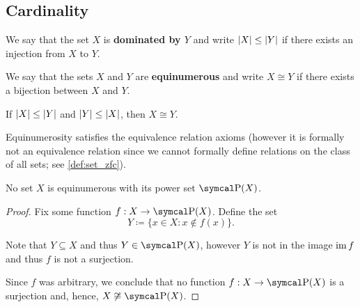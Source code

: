 \subsection{Cardinality}\label{subsec:cardinality}

\begin{definition}\label{def:set_domination}\cite[145]{Enderton1977}
  We say that the set \( X \) is \textbf{dominated by \( Y \)} and write \( \left\vert X \right\vert \leq \left\vert Y \right\vert \) if there exists an injection from \( X \) to \( Y \).
\end{definition}

\begin{definition}\label{def:equinumerous_sets}\cite[129]{Enderton1977}
  We say that the sets \( X \) and \( Y \) are \textbf{equinumerous} and write \( X \cong Y \) if there exists a bijection between \( X \) and \( Y \).
\end{definition}

\begin{theorem}\label{thm:cantor_schroder_bernstein}\cite[147]{Enderton1977}
  If \( \left\vert X \right\vert \leq \left\vert Y \right\vert \) and \( \left\vert Y \right\vert \leq \left\vert X \right\vert \), then \( X \cong Y \).
\end{theorem}

\begin{proposition}\label{thm:equinumerousity_equivalence}\cite[theorem 6A]{Enderton1977}
  Equinumerosity satisfies the equivalence relation axioms (however it is formally not an equivalence relation since we cannot formally define relations on the class of all sets; see \cref{def:set_zfc}).
\end{proposition}

\begin{theorem}[Cantor]\label{thm:cantor_power_set_theorem}\cite[theorem 6B]{Enderton1977}
  No set \( X \) is equinumerous with its power set \( \Power(X) \).
\end{theorem}
\begin{proof}
  Fix some function \( f: X \to \Power(X) \). Define the set
  \begin{equation*}
    Y \coloneqq \{ x \in X \colon x \not\in f(x) \}.
  \end{equation*}

  Note that \( Y \subseteq X \) and thus \( Y \in \Power(X) \), however \( Y \) is not in the image \( \operatorname{im} f \) and thus \( f \) is not a surjection.

  Since \( f \) was arbitrary, we conclude that no function \( f: X \to \Power(X) \) is a surjection and, hence, \( X \not\cong \Power(X) \).
\end{proof}

